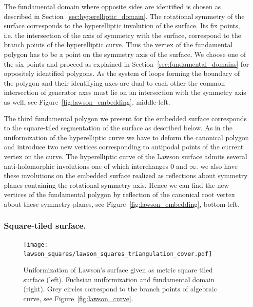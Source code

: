 \documentclass[Thesis]{subfiles}
\begin{document}
The fundamental domain where opposite sides are identified is chosen as described in Section~\ref{sec:hyperelliptic_domain}. The rotational symmetry of the surface corresponds to the hyperelliptic involution of the surface. Its fix points, i.e. the intersection of the axis of symmetry with the surface, correspond to the branch points of the hyperelliptic curve. Thus the vertex of the fundamental polygon has to be a point on the symmetry axis of the surface. We choose one of the six points and proceed as explained in Section~\ref{sec:fundamental_domains} for oppositely identified polygons. As the system of loops forming the boundary of the polygon and their identifying axes are dual to each other the common intersection of generator axes must lie on an intersection with the symmetry axis as well, see Figure~\ref{fig:lawson_embedding}, middle-left.

The third fundamental polygon we present for the embedded surface corresponds to the square-tiled segmentation of the surface as described below. As in the uniformization of the hyperelliptic curve we have to deform the canonical polygon and introduce two new vertices corresponding to antipodal points of the current vertex on the curve. The hyperelliptic curve of the Lawson surface admits several anti-holomorphic involutions one of which interchanges $0$ and $\infty$. we also have these involutions on the embedded surface realized as reflections about symmetry planes containing the rotational symmetry axis. Hence we can find the new vertices of the fundamental polygon by reflection of the canonical root vertex about these symmetry planes, see Figure~\ref{fig:lawson_embedding}, bottom-left.

\subsubsection{Square-tiled surface.}

\begin{figure}
	\centering
	\resizebox{!}{6cm} {
	\texttt{[image: lawson\_squares/lawson\_squares\_triangulation\_cover.pdf]}
	}
	\caption{Uniformization of Lawson's surface given as metric square tiled surface (left). Fuchsian
uniformization and fundamental domain (right). Grey circles correspond to the branch points of algebraic curve, see Figure~\ref{fig:lawson_curve}.}
\label{fig:lawson_squares}
\end{figure}
\end{document}
